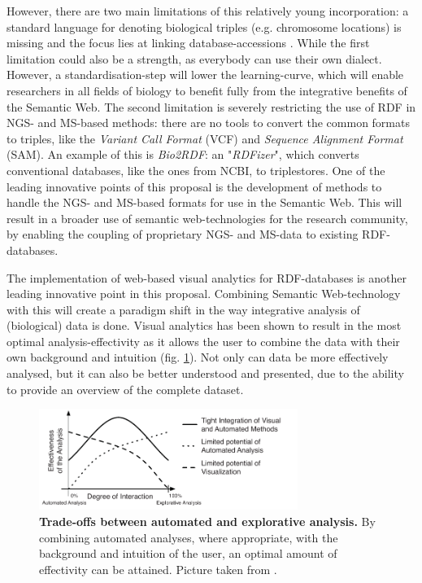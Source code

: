 \documentclass[twoside,fontsize=10pt]{article}
\begin{document}
However, there are two main limitations of this relatively young incorporation: a standard language for denoting biological triples (e.g. chromosome locations) is missing and the focus lies at linking database-accessions \citep{Ruttenberg2007}. While the first limitation could also be a strength, as everybody can use their own dialect. However, a standardisation-step will lower the learning-curve, which will enable researchers in all fields of biology to benefit fully from the integrative benefits of the Semantic Web. The second limitation is severely restricting the use of RDF in NGS- and MS-based methods: there are no tools to convert the common formats to triples, like the \textit{Variant Call Format} (VCF) and \textit{Sequence Alignment Format} (SAM). An example of this is  \textit{Bio2RDF}\cite{Belleau2008}: an "\textit{RDFizer}", which converts conventional databases, like the ones from NCBI, to triplestores. One of the leading innovative points of this proposal is the development of methods to handle the NGS- and MS-based formats for use in the Semantic Web. This will result in a broader use of semantic web-technologies for the research community, by enabling the coupling of proprietary NGS- and MS-data to existing RDF-databases.
\medskip

\noindent
The implementation of web-based visual analytics for RDF-databases is another leading innovative point in this proposal. Combining Semantic Web-technology with this will create a paradigm shift in the way integrative analysis of (biological) data is done. Visual analytics has been shown to result in the most optimal analysis-effectivity as it allows the user to combine the data with their own background and intuition (fig. \ref{fig:ae}). Not only can data be more effectively analysed, but it can also be better understood and presented, due to the ability to provide an overview of the complete dataset\cite{Thomas2005, Keim}. 

\begin{figure}[H]
    \centering
    \includegraphics[width=0.75\textwidth]{autoVSexplo}
    \caption{\textbf{Trade-offs between automated and explorative analysis.} By combining automated analyses, where appropriate, with the background and intuition of the user, an optimal amount of effectivity can be attained. Picture taken from \citet{Keim}.}
    \label{fig:ae}
\end{figure}
\medskip
\end{document}
